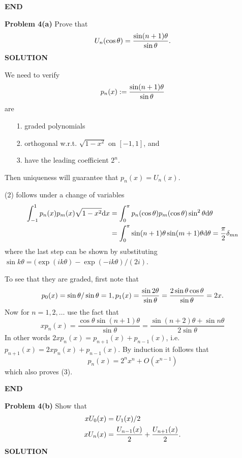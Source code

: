 \documentclass[12pt,a4paper]{article}
\begin{document}
\textbf{END}

\textbf{Problem 4(a)} Prove that
\[
U_n(\cos \ensuremath{\theta}) = {\sin(n+1) \ensuremath{\theta} \over \sin \ensuremath{\theta}}.
\]
\textbf{SOLUTION}

We need to verify
\[
p_n(x) := {\sin(n+1) \ensuremath{\theta} \over \sin \ensuremath{\theta}}
\]
are

\begin{itemize}
\item[1. ] graded polynomials


\item[2. ] orthogonal w.r.t. $\sqrt{1-x^2}$ on $[-1,1]$, and


\item[3. ] have the leading coefficient $2^n$.

\end{itemize}
Then uniqueness will guarantee that $p_n(x) = U_n(x)$.

(2) follows under a change of variables
\begin{align*}
\int_{-1}^1 p_n(x)p_m(x)\sqrt{1-x^2}{\rm d}x &= \int_0^{\ensuremath{\pi}}p_n(\cos \ensuremath{\theta})p_m(\cos \ensuremath{\theta})\sin^2 \ensuremath{\theta}{\rm d} \ensuremath{\theta} \\
&= \int_0^{\ensuremath{\pi}}\sin(n+1) \ensuremath{\theta}\sin(m+1) \ensuremath{\theta}{\rm d} \ensuremath{\theta}=\frac{\ensuremath{\pi}}{2}\ensuremath{\delta}_{mn}
\end{align*}
where the last step can be shown by substituting $\sin k\ensuremath{\theta} = (\exp(ik\ensuremath{\theta})-\exp(-ik\ensuremath{\theta})/(2i)$.

To see that they are graded, first note that
\[
p_0(x) = {\sin \ensuremath{\theta} /\sin \ensuremath{\theta}} = 1, p_1(x) =  {\sin 2 \ensuremath{\theta} \over \sin \ensuremath{\theta}} = {2 \sin \ensuremath{\theta} \cos \ensuremath{\theta} \over \sin \ensuremath{\theta}} = 2x.
\]
Now for $n = 1,2,\ensuremath{\ldots}$  use the fact that
\[
xp_n(x)=\frac{\cos \ensuremath{\theta}\sin(n+1) \ensuremath{\theta}}{\sin \ensuremath{\theta}}=\frac{\sin (n+2) \ensuremath{\theta}+\sin n \ensuremath{\theta}}{2\sin \ensuremath{\theta}}
\]
In other words $2xp_n(x)=p_{n+1}(x)+p_{n-1}(x)$, i.e. $p_{n+1}(x) = 2x p_n(x) + p_{n-1}(x).$ By induction it follows that
\[
p_n(x) = 2^n x^n + O(x^{n-1})
\]
which also proves (3).

\textbf{END}

\textbf{Problem 4(b)} Show that
\begin{align*}
x U_0(x) &= U_1(x)/2 \\
x U_n(x) &= {U_{n-1}(x) \over 2} + {U_{n+1}(x) \over 2}.
\end{align*}
\textbf{SOLUTION}
\end{document}
